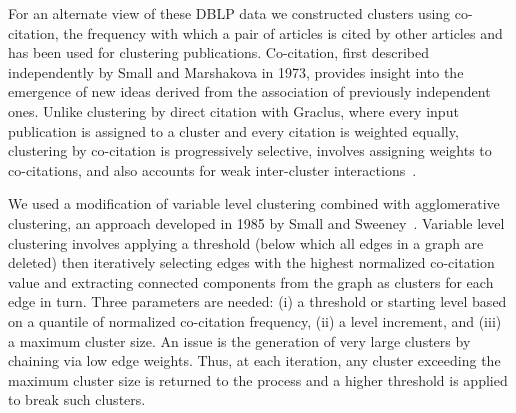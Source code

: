 For an alternate view of these DBLP data we constructed clusters using co-citation, the frequency with which a pair of articles is cited by other articles\cite{small_co-citation_1973,marshakova-shaikevich_co-citation_1973} and has been used for clustering publications. Co-citation, first described independently by Small and Marshakova in 1973, provides insight into the emergence of new ideas derived from the association of previously independent ones. Unlike clustering by direct citation with Graclus, where every input publication is assigned to a cluster and every citation is weighted equally, clustering by co-citation is progressively selective, involves assigning weights to co-citations, and also accounts for weak inter-cluster interactions~\cite{boyack_cocitation_2010,boyack_improving_2013,small_structure_1974,small_clustering_1985}. 


We used a modification of variable level clustering combined with agglomerative clustering, an approach developed in 1985 by Small and Sweeney~\cite{small_clustering_1985}. Variable level clustering involves applying a threshold (below which all edges in a graph are deleted) then iteratively selecting edges with the highest normalized co-citation value and extracting connected components from the graph as clusters for each edge in turn. Three parameters are needed: (i) a threshold or starting level based on a quantile of normalized co-citation frequency, (ii) a level increment, and (iii) a maximum cluster size. An issue is the generation of very large clusters by chaining via low edge weights.  Thus, at each iteration, any cluster exceeding the maximum cluster size  is returned to the process and a higher threshold is applied to break such clusters.

